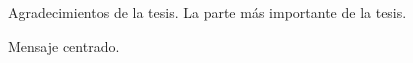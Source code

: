
\begin{acknowledgements}

Agradecimientos de la tesis. La parte más importante de la tesis.

\begin{center}
Mensaje centrado.
\end{center}

\end{acknowledgements}